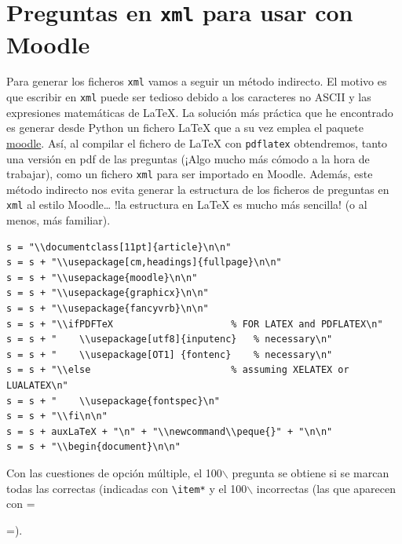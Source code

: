 \documentclass[10pt,a4paper]{report}
\begin{document}
\chapter{Preguntas en \texttt{xml} para usar con Moodle}
\label{sec:org89c0709}

Para generar los ficheros \texttt{xml} vamos a seguir un método
indirecto. El motivo es que escribir en \texttt{xml} puede ser tedioso
debido a los caracteres no ASCII y las expresiones matemáticas de
\LaTeX{}. La solución más práctica que he encontrado es generar desde
Python un fichero \LaTeX{} que a su vez emplea el paquete
\href{https://ctan.org/pkg/moodle}{moodle}. Así, al
compilar el fichero de \LaTeX{} con \texttt{pdflatex} obtendremos, tanto
una versión en pdf de las preguntas (¡Algo mucho más cómodo a la hora
de trabajar), como un fichero \texttt{xml} para ser importado en
Moodle. Además, este método indirecto nos evita generar la estructura
de los ficheros de preguntas en \texttt{xml} al estilo Moodle\dots{} !la
estructura en \LaTeX{} es mucho más sencilla! (o al menos, más
familiar).

\begin{verbatim}
s = "\\documentclass[11pt]{article}\n\n"
s = s + "\\usepackage[cm,headings]{fullpage}\n\n"
s = s + "\\usepackage{moodle}\n\n"
s = s + "\\usepackage{graphicx}\n\n"
s = s + "\\usepackage{fancyvrb}\n\n"
s = s + "\\ifPDFTeX                     % FOR LATEX and PDFLATEX\n"
s = s + "    \\usepackage[utf8]{inputenc}   % necessary\n"
s = s + "    \\usepackage[OT1] {fontenc}    % necessary\n"
s = s + "\\else                         % assuming XELATEX or LUALATEX\n"
s = s + "    \\usepackage{fontspec}\n"
s = s + "\\fi\n\n"
s = s + auxLaTeX + "\n" + "\\newcommand\\peque{}" + "\n\n"
s = s + "\\begin{document}\n\n"
\end{verbatim}

Con las cuestiones de opción múltiple, el 100$\backslash$%
pregunta se obtiene si se marcan todas las correctas (indicadas con
\texttt{\textbackslash{}item*} y el 100$\backslash$%
incorrectas (las que aparecen con =\item =).
\end{document}
